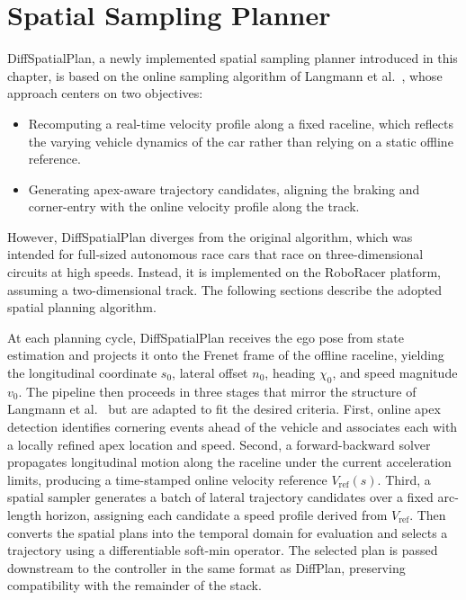 \chapter{Spatial Sampling Planner}
\label{chapter:SpatialSampler}

DiffSpatialPlan, a newly implemented spatial sampling planner introduced in this chapter, is based on the online sampling algorithm of Langmann et al.\ \cite{langmann_OnlineVelocityProfile_2025}, whose approach centers on two objectives:
\begin{itemize}
    \item Recomputing a real-time velocity profile along a fixed raceline, which reflects the varying vehicle dynamics of the car rather than relying on a static offline reference.
    \item Generating apex-aware trajectory candidates, aligning the braking and corner-entry with the online velocity profile along the track.
\end{itemize}
However, DiffSpatialPlan diverges from the original algorithm, which was intended for full-sized autonomous race cars that race on three-dimensional circuits at high speeds.
Instead, it is implemented on the RoboRacer platform, assuming a two-dimensional track.
The following sections describe the adopted spatial planning algorithm.

At each planning cycle, DiffSpatialPlan receives the ego pose from state estimation and projects it onto the Frenet frame of the offline raceline, yielding the longitudinal coordinate $s_0$, lateral offset $n_0$, heading $\chi_0$, and speed magnitude $v_0$.
The pipeline then proceeds in three stages that mirror the structure of Langmann et al.\ \cite{langmann_OnlineVelocityProfile_2025} but are adapted to fit the desired criteria.
First, online apex detection identifies cornering events ahead of the vehicle and associates each with a locally refined apex location and speed.
Second, a forward-backward solver propagates longitudinal motion along the raceline under the current acceleration limits, producing a time-stamped online velocity reference $V_{\text{ref}}(s)$.
Third, a spatial sampler generates a batch of lateral trajectory candidates over a fixed arc-length horizon, assigning each candidate a speed profile derived from $V_{\text{ref}}$.
Then converts the spatial plans into the temporal domain for evaluation and selects a trajectory using a differentiable soft-min operator.
The selected plan is passed downstream to the controller in the same format as DiffPlan, preserving compatibility with the remainder of the stack.

